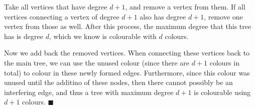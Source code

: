 \documentclass[11pt]{article}
\begin{document}
\begin{Parts}
\begin{solution}
    Take all vertices that have degree $d+1$, and remove a vertex from them. If all vertices connecting a vertex of degree $d+1$ also has degree $d+1$, remove one vertex from those as well. After this process, the maximum degree that this tree has is degree $d$, which we know is colourable with $d$ colours. 

    Now we add back the removed vertices. When connecting these vertices back to the main tree, we can use the unused colour (since there are $d+1$ colours in total) to colour in these newly formed edges. Furthermore, since this colour was unused until the additino of these nodes, then there cannot possibly be an interfering edge, and thus a tree with maximum degree $d+1$ is colourable using $d+1$ colours. $\blacksquare$
\end{solution}

\end{Parts}
\end{document}
